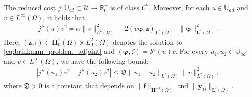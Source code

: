 \documentclass[final]{siamart0216}
\begin{document}
\begin{theorem}
\label{eq:theorem_properties_j}
The reduced cost $j: \mathbb{U}_{ad} \subset \mathcal{U}\to\mathbb{R}_0^+$ is of class $C^2$. Moreover, for each $u\in\mathbb{U}_{ad}$ and $v\in L^{\infty}(\Omega)$, it holds that
\begin{align}
\label{eq:identity_j}
j''(u)v^2=\alpha\|v\|_{L^2(\Omega)}^2-2(v\boldsymbol{\varphi},\mathbf{z})_{\mathbf{L}^2(\Omega)}+\|\boldsymbol{\varphi}\|_{\mathbf{L}^2(\Omega)}^2.
\end{align}
Here, $(\mathbf{z},\mathsf{r})\in\mathbf{H}_0^1(\Omega)\times L_0^2(\Omega)$ denotes the solution to \eqref{eq:brinkamn_problem_adjoint} and $(\boldsymbol{\varphi},\zeta)=\mathcal{S}'(u)v$. For every $u_1,u_2\in\mathbb{U}_{ad}$ and $v\in L^{\infty}(\Omega)$, we have the following bound:
\begin{eqnarray}
\label{eq:lemma_j}
|j''(u_1)v^2-j''(u_2)v^2|\leq \mathfrak{D}\|u_1-u_2\|_{L^2(\Omega)}\|v\|_{L^2(\Omega)}^2,
\end{eqnarray}
where $\mathfrak{D}>0$ is a constant that depends on $\|\mathbf{f}\|_{\mathbf{H}^{-1}(\Omega)}$ and $\|\mathbf{y}_\Omega\|_{\mathbf{L}^2(\Omega)}$.
\end{theorem}
\end{document}
